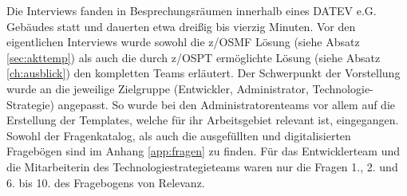 Die Interviews fanden in  Besprechungsräumen innerhalb eines DATEV e.G. Gebäudes statt und dauerten etwa dreißig bis vierzig Minuten.
Vor den eigentlichen Interviews wurde sowohl die z/OSMF Lösung (siehe Absatz \ref{sec:akttemp}) als auch die durch z/OSPT ermöglichte Lösung (siehe Absatz \ref{ch:ausblick}) den kompletten Teams erläutert.
Der Schwerpunkt der Vorstellung wurde an die jeweilige Zielgruppe (Entwickler, Administrator, Technologie-Strategie) angepasst.
So wurde bei den Administratorenteams vor allem auf die Erstellung der Templates, welche für ihr Arbeitsgebiet relevant ist, eingegangen.
Sowohl der Fragenkatalog, als auch die ausgefüllten und digitalisierten Fragebögen sind im Anhang \ref{app:fragen} zu finden.
Für das Entwicklerteam und die Mitarbeiterin des Technologiestrategieteams waren nur die Fragen 1., 2. und 6. bis 10. des Fragebogens von Relevanz.
